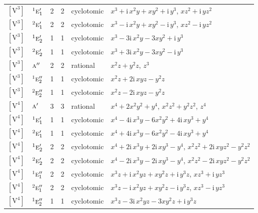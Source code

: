 \documentclass[10pt,a4paper]{article}
\numberwithin{equation}{section}
\newcommand{\irr}[1]{\text{\normalfont\scshape #1}}
\newcommand{\conjpair}[1]{{}^{#1}}
\newcommand{\iunit}{\mathrm{i}}
\newcommand{\jahn}[1]{\mathrm{#1}}
\newlength{\fillwidth}\newlength{\cellwidth}\newlength{\colwidth}
\begin{document}
{\begin{longtable}{@{}llrrl>{\RaggedRight\arraybackslash}p{\fillwidth}@{}}
$\jahn{[V^{3}]}$ & $\conjpair{1}\irr{e}_{1}'$ & 2 & 2 & cyclotomic & $x^{3} + \iunit{}\,x^{2}y + xy^{2} + \iunit{}\,y^{3}$, $xz^{2} + \iunit{}\,yz^{2}$\\
$\jahn{[V^{3}]}$ & $\conjpair{2}\irr{e}_{1}'$ & 2 & 2 & cyclotomic & $x^{3} - \iunit{}\,x^{2}y + xy^{2} - \iunit{}\,y^{3}$, $xz^{2} - \iunit{}\,yz^{2}$\\
$\jahn{[V^{3}]}$ & $\conjpair{1}\irr{e}_{2}'$ & 1 & 1 & cyclotomic & $x^{3} - 3\iunit{}\,x^{2}y - 3xy^{2} + \iunit{}\,y^{3}$\\
$\jahn{[V^{3}]}$ & $\conjpair{2}\irr{e}_{2}'$ & 1 & 1 & cyclotomic & $x^{3} + 3\iunit{}\,x^{2}y - 3xy^{2} - \iunit{}\,y^{3}$\\
$\jahn{[V^{3}]}$ & $\irr{a}''$ & 2 & 2 & rational & $x^{2}z + y^{2}z$, $z^{3}$\\
$\jahn{[V^{3}]}$ & $\conjpair{1}\irr{e}_{2}''$ & 1 & 1 & cyclotomic & $x^{2}z + 2\iunit{}\,xyz - y^{2}z$\\
$\jahn{[V^{3}]}$ & $\conjpair{2}\irr{e}_{2}''$ & 1 & 1 & cyclotomic & $x^{2}z - 2\iunit{}\,xyz - y^{2}z$\\
$\jahn{[V^{4}]}$ & $\irr{a}'$ & 3 & 3 & rational & $x^{4} + 2x^{2}y^{2} + y^{4}$, $x^{2}z^{2} + y^{2}z^{2}$, $z^{4}$\\
$\jahn{[V^{4}]}$ & $\conjpair{1}\irr{e}_{1}'$ & 1 & 1 & cyclotomic & $x^{4} - 4\iunit{}\,x^{3}y - 6x^{2}y^{2} + 4\iunit{}\,xy^{3} + y^{4}$\\
$\jahn{[V^{4}]}$ & $\conjpair{2}\irr{e}_{1}'$ & 1 & 1 & cyclotomic & $x^{4} + 4\iunit{}\,x^{3}y - 6x^{2}y^{2} - 4\iunit{}\,xy^{3} + y^{4}$\\
$\jahn{[V^{4}]}$ & $\conjpair{1}\irr{e}_{2}'$ & 2 & 2 & cyclotomic & $x^{4} + 2\iunit{}\,x^{3}y + 2\iunit{}\,xy^{3} - y^{4}$, $x^{2}z^{2} + 2\iunit{}\,xyz^{2} - y^{2}z^{2}$\\
$\jahn{[V^{4}]}$ & $\conjpair{2}\irr{e}_{2}'$ & 2 & 2 & cyclotomic & $x^{4} - 2\iunit{}\,x^{3}y - 2\iunit{}\,xy^{3} - y^{4}$, $x^{2}z^{2} - 2\iunit{}\,xyz^{2} - y^{2}z^{2}$\\
$\jahn{[V^{4}]}$ & $\conjpair{1}\irr{e}_{1}''$ & 2 & 2 & cyclotomic & $x^{3}z + \iunit{}\,x^{2}yz + xy^{2}z + \iunit{}\,y^{3}z$, $xz^{3} + \iunit{}\,yz^{3}$\\
$\jahn{[V^{4}]}$ & $\conjpair{2}\irr{e}_{1}''$ & 2 & 2 & cyclotomic & $x^{3}z - \iunit{}\,x^{2}yz + xy^{2}z - \iunit{}\,y^{3}z$, $xz^{3} - \iunit{}\,yz^{3}$\\
$\jahn{[V^{4}]}$ & $\conjpair{1}\irr{e}_{2}''$ & 1 & 1 & cyclotomic & $x^{3}z - 3\iunit{}\,x^{2}yz - 3xy^{2}z + \iunit{}\,y^{3}z$\\

\end{longtable}}
\end{document}
